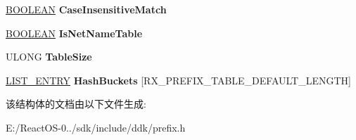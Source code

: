 \begin{DoxyCompactItemize}
\hyperlink{_processor_bind_8h_a112e3146cb38b6ee95e64d85842e380a}{B\+O\+O\+L\+E\+AN} {\bfseries Case\+Insensitive\+Match}
\item 
\mbox{\label{struct___r_x___p_r_e_f_i_x___t_a_b_l_e_aa3ca2ee478da172d2e537cc7059d5c46}} 
\hyperlink{_processor_bind_8h_a112e3146cb38b6ee95e64d85842e380a}{B\+O\+O\+L\+E\+AN} {\bfseries Is\+Net\+Name\+Table}
\item 
\mbox{\label{struct___r_x___p_r_e_f_i_x___t_a_b_l_e_ae397b8ef1555e2a4824e2724d4b8fed7}} 
U\+L\+O\+NG {\bfseries Table\+Size}
\item 
\mbox{\label{struct___r_x___p_r_e_f_i_x___t_a_b_l_e_a5566dfa1fa63658221eaa3b42dfbcd00}} 
\hyperlink{struct___l_i_s_t___e_n_t_r_y}{L\+I\+S\+T\+\_\+\+E\+N\+T\+RY} {\bfseries Hash\+Buckets} \mbox{[}R\+X\+\_\+\+P\+R\+E\+F\+I\+X\+\_\+\+T\+A\+B\+L\+E\+\_\+\+D\+E\+F\+A\+U\+L\+T\+\_\+\+L\+E\+N\+G\+TH\mbox{]}
\end{DoxyCompactItemize}


该结构体的文档由以下文件生成\+:\begin{DoxyCompactItemize}
\item 
E\+:/\+React\+O\+S-\/0../sdk/include/ddk/prefix.\+h\end{DoxyCompactItemize}
